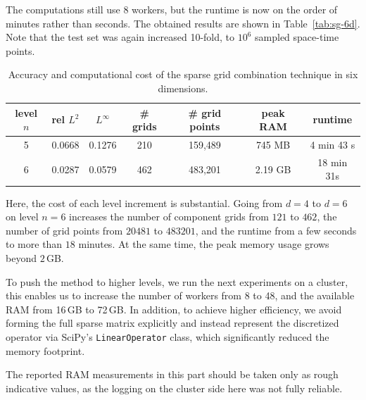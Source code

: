 The computations still use 8 workers, but the runtime is now on the order of minutes rather than seconds.
The obtained results are shown in Table~\ref{tab:sg-6d}.
Note that the test set was again increased 10-fold, to $10^6$ sampled space-time points.

\begin{table}[ht]
\centering
\begin{tabular}{ |c|c|c|c|c|c|c| } 
\hline
level $n$ & rel $L^2$ & $L^\infty$ & \# grids & \# grid points & peak RAM & runtime \\
\hline
5 & 0.0668 & 0.1276 & 210 & 159,489 & 745 MB & 4 min 43 s \\
\hline
6 & 0.0287 & 0.0579 & 462 & 483,201 & 2.19 GB & 18 min 31s \\
\hline
\end{tabular}
\caption{Accuracy and computational cost of the sparse grid combination technique in six dimensions.}
    \label{tab:sg-6d-estimate}
\end{table}

Here, the cost of each level increment is substantial.
Going from $d=4$ to $d=6$ on level $n=6$ increases the number of component grids from $121$ to $462$,
the number of grid points from $20481$ to $483201$,
and the runtime from a few seconds to more than $18$ minutes.
At the same time, the peak memory usage grows beyond $2$\,GB.

To push the method to higher levels, we run the next experiments on a cluster,
this enables us to increase the number of workers from 8 to 48,
and the available RAM from 16\,GB to 72\,GB.
In addition, to achieve higher efficiency, we
avoid forming the full sparse matrix explicitly and instead represent the discretized operator via SciPy's \texttt{LinearOperator} class,
which significantly reduced the memory footprint.

The reported RAM measurements in this part should be taken only as rough indicative values, as the logging on the cluster side here was not fully reliable.

